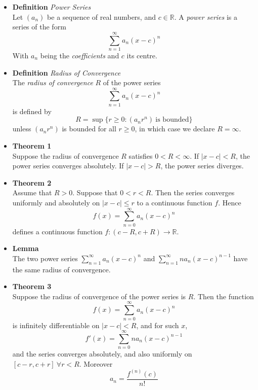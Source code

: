 \documentclass[11pt,a4paper]{article}
\begin{document}
\begin{itemize}
    \item \textbf{Definition} \emph{Power Series} \\
        Let $(a_n)$ be a sequence of real numbers, and $c \in \mathbb{R}$.
        A \emph{power series} is a series of the form
        \[
            \sum_{n=1}^\infty a_n{(x-c)}^n
        \]
        With $a_n$ being the \emph{coefficients} and $c$ its centre.

    \item \textbf{Definition} \emph{Radius of Convergence} \\
        The \emph{radius of convergence} $R$ of the power series
        \[
            \sum_{n=1}^\infty a_n{(x-c)}^n
        \]
        is defined by
        \[
            R = \sup \{ r \geq 0 : (a_n r^n) \ \text{is bounded} \}
        \]
        unless $(a_n r^n)$ is bounded for all $r \geq 0$, in which case we declare
        $R = \infty$.

    \item \textbf{Theorem 1} \\
        Suppose the radius of convergence $R$ satisfies $0 < R < \infty$.
        If $|x - c| < R$, the power series converges absolutely.
        If $|x - c| > R$, the power series diverges.

    \item \textbf{Theorem 2} \\
        Assume that $R > 0$.
        Suppose that $0 < r < R$.
        Then the series converges uniformly and absolutely on $|x-c| \leq r$ to a continuous
        function $f$.
        Hence
        \[
            f(x) = \sum_{n=0}^\infty a_n{(x-c)}^n
        \]
        defines a continuous function $f : (c - R, c + R) \to \mathbb{R}$.

    \item \textbf{Lemma} \\
        The two power series $\sum_{n=1}^\infty a_n {(x-c)}^n$ and
        $\sum_{n=1}^\infty n a_n {(x-c)}^{n-1}$ have the same radius of convergence.

    \item \textbf{Theorem 3} \\
        Suppose the radius of convergence of the power series is $R$.
        Then the function
        \[
        f(x) = \sum_{n=0}^\infty a_n {(x-c)}^n
        \]
        is infinitely differentiable on $|x-c| < R$, and for such $x$,
        \[
            f'(x) = \sum_{n=0}^\infty n a_n {(x-c)}^{n-1}
        \]
        and the series converges absolutely, and also uniformly on $[c-r, c+r] \ \forall r<R$.
        Moreover
        \[
            a_n = \frac{f^{(n)}(c)}{n!}
        \]

\end{itemize}
\end{document}
